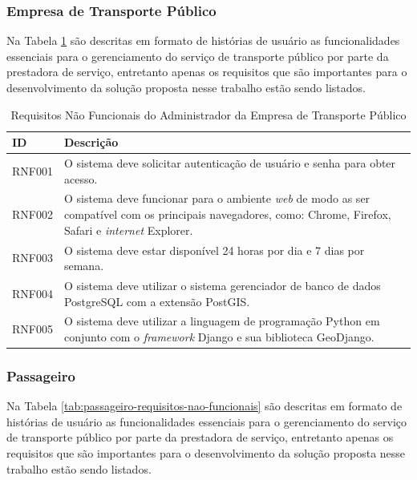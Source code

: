 {{\subsubsection*{Empresa de Transporte Público}

Na Tabela \ref{tab:empresa-requisitos-nao-funcionais} são descritas em formato de histórias de usuário as funcionalidades essenciais para o gerenciamento do serviço de transporte público por parte da prestadora de serviço, entretanto apenas os requisitos que são importantes para o desenvolvimento da solução proposta nesse trabalho estão sendo listados.

{\renewcommand{\arraystretch}{2}
\begin{table}[H]
\centering
\caption{Requisitos Não Funcionais do Administrador da Empresa de Transporte Público}
\label{tab:empresa-requisitos-nao-funcionais}
\begin{tabular}{ l | p{13.5cm} }
\hline
\textbf{ID} & \textbf{Descrição} \\
\hline
RNF001 & O sistema deve solicitar autenticação de usuário e senha para obter acesso. \\ \hline
RNF002 & O sistema deve funcionar para o ambiente \textit{web} de modo as ser compatível com os principais navegadores, como: Chrome, Firefox, Safari e \textit{internet} Explorer. \\ \hline
RNF003 & O sistema deve estar disponível 24 horas por dia e 7 dias por semana. \\ \hline
RNF004 & O sistema deve utilizar o sistema gerenciador de banco de dados PostgreSQL com a extensão PostGIS. \\ \hline
RNF005 & O sistema deve utilizar a linguagem de programação Python em conjunto com o \textit{framework} Django e sua biblioteca GeoDjango. \\ \hline
\end{tabular}
\end{table}

\subsubsection*{Passageiro}

Na Tabela \ref{tab:passageiro-requisitos-nao-funcionais} são descritas em formato de histórias de usuário as funcionalidades essenciais para o gerenciamento do serviço de transporte público por parte da prestadora de serviço, entretanto apenas os requisitos que são importantes para o desenvolvimento da solução proposta nesse trabalho estão sendo listados.

}}}
